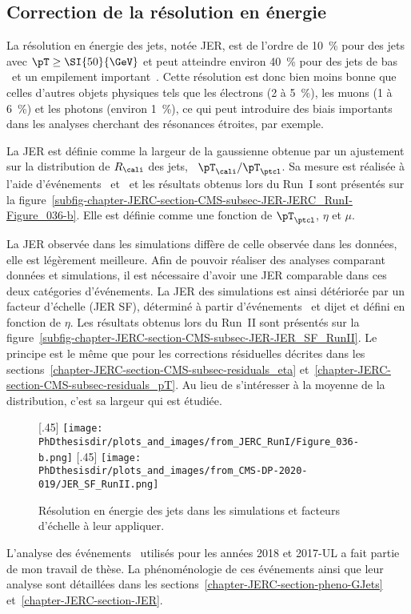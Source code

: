 \subsection{Correction de la résolution en énergie}\label{chapter-JERC-section-CMS-subsec-JER}
La résolution en énergie des jets, notée JER, est de l'ordre de \SI{10}{\%} pour des jets avec $\pT\geq\SI{50}{\GeV}$ et peut atteindre environ \SI{40}{\%} pour des jets de bas \pT\ et un empilement important~\cite{JERC_RunI}.
Cette résolution est donc bien moins bonne que celles d'autres objets physiques tels que les électrons (\num{2} à \SI{5}{\%}), les muons (\num{1} à \SI{6}{\%}) et les photons (environ \SI{1}{\%}), ce qui peut introduire des biais importants dans les analyses cherchant des résonances étroites, par exemple.
\par La JER est définie comme la largeur de la gaussienne obtenue par un ajustement sur la distribution de $R_\cali$ des jets, \ie\ $\pT_\cali/\pT_\ptcl$.
Sa mesure est réalisée à l'aide d'événements \Gjets\ et \Zjets\ et les résultats obtenus lors du Run~I sont présentés sur la figure~\ref{subfig-chapter-JERC-section-CMS-subsec-JER-JERC_RunI-Figure_036-b}.
Elle est définie comme une fonction de $\pT_\ptcl$, $\eta$ et $\mu$.
\par La JER observée dans les simulations diffère de celle observée dans les données, elle est légèrement meilleure.
Afin de pouvoir réaliser des analyses comparant données et simulations, il est nécessaire d'avoir une JER comparable dans ces deux catégories d'événements.
La JER des simulations est ainsi détériorée par un facteur d'échelle (JER SF), déterminé à partir d'événements \Gjets\ et dijet et défini en fonction de $\eta$.
Les résultats obtenus lors du Run~II sont présentés sur la figure~\ref{subfig-chapter-JERC-section-CMS-subsec-JER-JER_SF_RunII}.
Le principe est le même que pour les corrections résiduelles décrites dans les sections~\ref{chapter-JERC-section-CMS-subsec-residuals_eta} et~\ref{chapter-JERC-section-CMS-subsec-residuals_pT}. Au lieu de s'intéresser à la moyenne de la distribution, c'est sa largeur qui est étudiée.
\begin{figure}[h]
\centering
{}[.45\textwidth]
{\texttt{[image: \\PhDthesisdir/plots\_and\_images/from\_JERC\_RunI/Figure\_036-b.png]}}
\hfill
{}[.45\textwidth]
{\texttt{[image: \\PhDthesisdir/plots\_and\_images/from\_CMS-DP-2020-019/JER\_SF\_RunII.png]}}
\caption[Résolution en énergie des jets.]{Résolution en énergie des jets dans les simulations et facteurs d'échelle à leur appliquer.}
\label{fig-chapter-JERC-section-CMS-subsec-JER}
\end{figure}
\par L'analyse des événements \Gjets\ utilisés pour les années 2018 et 2017-UL a fait partie de mon travail de thèse.
La phénoménologie de ces événements ainsi que leur analyse sont détaillées dans les sections~\ref{chapter-JERC-section-pheno-GJets} et~\ref{chapter-JERC-section-JER}.
